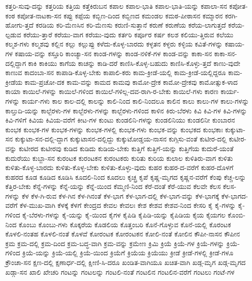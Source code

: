 {ಕತ್ತರಿ-ಸುವು-ದನ್ನು
ಕತ್ತರಿಯ
ಕತ್ತಿಯ
ಕತ್ತೆಕಿರುಬನ
ಕಪಾಲ
ಕಪಾಲ-ಭಾತಿ
ಕಪಾಲ-ಭಾತಿ-ಯನ್ನು
ಕಪಾಲಾ-ಸನ
ಕಪೋತ-ಕಂಠ
ಕಪೋತ-ನಾಟಕಾ-ಸನ
ಕಪ್ಪು
ಕಪ್ಪೆಯ
ಕಬ್ಬಿಣ-ದಿಂದ
ಕಬ್ಬಿಣದ
ಕಮಂಡಲ
ಕಮಠ-ಪೀಠಾಸನ
ಕಮ್ಮಾರನ
ಕರಗಿ-ಹೋಗು-ತ್ತದೆ
ಕರಡಿಯ
ಕರಿ-ಮೆಣಸಿನ
ಕರಿ-ಮೆಣಸು
ಕರುಣಿ-ಸುತ್ತಾನೆ
ಕರುಣೆ
ಕರುಣೆಯ
ಕರೆಯ-ಲಾಗುತ್ತದೆ
ಕರೆಯ-ಲ್ಪಡುವ
ಕರೆಯು-ತ್ತಾರೆ
ಕರೆಯು-ವಾಗ
ಕರೆಯು-ವುದು
ಕರ್ತರಿ
ಕರ್ಪೂರ
ಕರ್ಷ
ಕಲಶ
ಕಲಿಯು-ತ್ತಿರುವ
ಕಲೆಯು
ಕಲ್ಮಶ-ಗಳು
ಕಲ್ಮಶವು
ಕಲ್ಲಿನ
ಕಲ್ಲು
ಕಲ್ಲುಪ್ಪು
ಕಳೆದು-ಕೊಳ್ಳ-ಬಾರದು
ಕಳ್ಳತನ
ಕಳ್ಳರು
ಕಳ್ಳಿಯ
ಕವಿತೆ-ಗಳನ್ನು
ಕಷಾಯ-ಗಳ
ಕಷಾಯ-ವನ್ನು
ಕಸ್ತೂರಿ
ಕಾಂಚ್ಯಾ-ಸನ
ಕಾಂಡ-ಗಳನ್ನು
ಕಾಂಡ-ನಳಿಕೆ-ಗಳ
ಕಾಂಡ-ವನ್ನು
ಕಾಕಾ-ಸನ
ಕಾಕಾ-ಸನ-ದಲ್ಲಿದ್ದಾಗ
ಕಾಕಿ
ಕಾಕಿಯು
ಕಾಗೆಯ
ಕಾಚನ್ನು
ಕಾಡಿ-ದರೆ
ಕಾಣಿಸಿ-ಕೊಳ್ಳ-ಬಹುದು
ಕಾಣಿಸಿ-ಕೊಳ್ಳು-ತ್ತದೆ
ಕಾಣು-ವುದೇ
ಕಾಣುವ
ಕಾದಂಬಾ-ಸನ
ಕಾಪಾಡಿ-ಕೊಳ್ಳ-ಬೇಕು
ಕಾಪಾಲಿ-ಕರು
ಕಾಮ-ಕ್ರೀಡೆ-ಯಲ್ಲಿ
ಕಾಮ-ಕ್ರೀಡೆ-ಯಲ್ಲಿದ್ದರೂ
ಕಾಮ-ಕ್ರೀಡೆಯ
ಕಾಮ-ಪ್ರಚೋ-ದಕ
ಕಾಮ-ವನ್ನು
ಕಾಮದ
ಕಾಮವು
ಕಾಮೋ-ದ್ರೇಕ
ಕಾಮೋ-ದ್ರೇಕವು
ಕಾಮೋತ್ಸುಕ-ಳಾದ
ಕಾಯಾ
ಕಾಯಿಲೆ-ಗಳನ್ನು
ಕಾಯಿಲೆ-ಗಳಿಂದ
ಕಾಯಿಲೆ-ಗಳಿಲ್ಲ-ದವ-ರಾಗಿ-ರ-ಬೇಕು
ಕಾಯಿಲೆ-ಗಳು
ಕಾರಣ
ಕಾರ್ಯ-ಗಳನ್ನು
ಕಾರ್ಯ-ಗಳು
ಕಾಲ
ಕಾಲ-ದಲ್ಲಿ
ಕಾಲನ್ನು
ಕಾಲಿ-ನಿಂದ
ಕಾಲಿ-ನಿಂದಲೂ
ಕಾಲಿನ
ಕಾಲು
ಕಾಲು-ಗಳ
ಕಾಲು-ಗಳನ್ನು
ಕಾಲ್ತುದಿ-ಯನ್ನು
ಕಾಲ್ಬೆರಳು-ಗಳ
ಕಾಲ್ಬೆರಳು-ಗಳನ್ನು
ಕಾಲ್ಬೆರಳು-ಗಳಿಂದ
ಕಾಳಿನ
ಕಿರು-ಬೆರಳು
ಕಿವಿ
ಕಿವಿ-ಗಳ
ಕಿವಿ-ಗಳನ್ನು
ಕಿವಿ-ಗಳಿಗೆ
ಕಿವಿಯ
ಕಿವಿಯ-ವರೆಗೆ
ಕೀಟ-ಗಳ
ಕುಂಟು
ಕುಂಡಲಿನಿ-ಗಳನ್ನು
ಕುಂಡಲಿನಿಯು
ಕುಂಡಲಿನೀ
ಕುಂಬಾರನ
ಕುಂಭಕ
ಕುಂಭಕ-ಗಳ
ಕುಂಭಕ-ಗಳನ್ನು
ಕುಂಭಕ-ಗಳಲ್ಲಿ
ಕುಂಭಕ-ಗಳು
ಕುಂಭಕ-ವನ್ನು
ಕುಂಭಕದ
ಕುಂಭಕಾಃ
ಕುಕ್ಕುಟಾ-ಸನ
ಕುಕ್ಕುಟಾ-ಸನ-ದಲ್ಲಿ-ದ್ದಾಗ
ಕುಕ್ಕುಟಾಸನ-ದಲ್ಲಿದ್ದು
ಕುಕ್ಕುಟೋಡ್ಡಯ-ನಾಸನ
ಕುಗ್ಗಿಸು-ವಂತೆ
ಕುಟೀರ-ದಲ್ಲಿ
ಕುಟೀರ-ವನ್ನು
ಕುಟೀರದ
ಕುಟೀರವು
ಕುಡಿದ
ಕುಡಿದು
ಕುಡಿಯ-ಬೇಕು
ಕುತ್ತಿಗೆ
ಕುತ್ತಿಗೆ-ಯನ್ನು
ಕುತ್ತಿಗೆಯ
ಕುದುರೆ-ಯಂತೆ
ಕುದುರೆಯು
ಕುಬ್ಜಾ-ಸನ
ಕುರಂಟಕ
ಕುರಂಟಕನ
ಕುರಂಟಕರು
ಕುರಿತು
ಕುರಿಯ
ಕುಲಾಲ
ಕುಳಿತಿರು-ವಾಗ
ಕುಳಿತು
ಕುಳಿತು-ಕೊಳ್ಳ-ಬಾರದು
ಕುಳಿತು-ಕೊಳ್ಳ-ಬೇಕು
ಕುಳಿತು-ಕೊಳ್ಳು-ವುದು
ಕುಹರ
ಕುಹರ-ದ-ವರೆಗೆ
ಕುಹರ-ದೊಳಗೆ
ಕುಹರದ
ಕೂಡ
ಕೂಡಿದ
ಕೂಡಿಸಿ
ಕೂದಲಿ-ನಿಂದ
ಕೂದಲು
ಕೃಚ್ಛ್ರ
ಕೃಪೆ
ಕೃಷ್ಣ-ಮೃಗದ
ಕೃಷ್ಣನ-ವರೆಗೆ
ಕೆಂಪು
ಕೆಚ್ಚ-ಲನ್ನು
ಕೆತ್ತಿರ-ಬೇಕು
ಕೆನ್ನೆ-ಗಳನ್ನು
ಕೆನ್ನೆ-ಯನ್ನು
ಕೆನ್ನೆ-ಯಿಂದ
ಕೆಮ್ಮಣಿ-ನಿಂದ
ಕೆರೆ-ದಂತೆ
ಕೆರೆ-ಯುವ
ಕೆಲವೇ
ಕೆಲಸ
ಕೆಲಸ-ಗಳನ್ನು
ಕೆಳ
ಕೆಳ-ಗಿ-ರುವ
ಕೆಳ-ಗಿನ
ಕೆಳ-ಗಿನಂತೆ
ಕೆಳ-ಭಾಗ
ಕೆಳ-ಭಾಗ-ದಲ್ಲಿ
ಕೆಳ-ಭಾಗ-ವನ್ನು
ಕೆಳ-ಭಾಗಕ್ಕೆ
ಕೆಳ-ಭಾಗದ-ವರೆಗೆ
ಕೆಳ-ಮುಖ-ವಾಗಿ
ಕೆಳಕ್ಕೆ
ಕೆಳಗೆ
ಕೇಂದ್ರದ
ಕೇವಲ
ಕೇವಲಃ
ಕೇಶ
ಕೇಶವ
ಕೇಶವ-ನಿಂದ
ಕೇಸರಿ
ಕೈ
ಕೈ-ಗಳನ್ನು
ಕೈ-ಗಳಿಂದ
ಕೈ-ಬೆರಳು-ಗಳನ್ನು
ಕೈ-ಯನ್ನು
ಕೈ-ಯಿಂದ
ಕೈಗಳ
ಕೈಪಿಡಿ
ಕೈಪಿಡಿ-ಯನ್ನು
ಕೈಪಿಡಿಯ
ಕೈಯ
ಕೈಯಗಲ
ಕೊಂಬಿ-ನಿಂದ
ಕೊಂಬು
ಕೊಂಬು-ಗಳು
ಕೊಕ್ಕರೆಯ
ಕೊಡಲಿಯ
ಕೊತ್ತಂಬರಿ
ಕೊನೆ-ಗೊಳ್ಳುವ
ಕೊನೆ-ಯಲ್ಲಿ
ಕೊರಂಟಕ
ಕೊಳಲಿ-ನಂತಹ
ಕೊಳಲಿ-ನಂತೆ
ಕೊಳವೆ
ಕೋರಂಟಕ
ಕೋರಂಟಕನ
ಕೋಲಿ-ನಂತೆ
ಕೋಲಿನ
ಕೌಪೀ-ನಾಸನ
ಕೌಪೀನ
ಕ್ರಮ
ಕ್ರಮ-ದಲ್ಲಿ
ಕ್ರಮ-ದಿಂದ
ಕ್ರಮ-ಬದ್ಧ-ವಾಗಿ
ಕ್ರಮ-ವನ್ನು
ಕ್ರಮೇಣ
ಕ್ರಿಮಿ
ಕ್ರಿಯೆ
ಕ್ರಿಯೆ-ಗಳ
ಕ್ರಿಯೆ-ಗಳನ್ನು
ಕ್ರಿಯೆ-ಗಳಿಂದ
ಕ್ರಿಯೆ-ಯನ್ನು
ಕ್ರಿಯೆ-ಯಲ್ಲಿ
ಕ್ರಿಯೆ-ಯಿಂದ
ಕ್ರಿಯೆಗೆ
ಕ್ರಿಯೆಯ
ಕ್ರಿಯೆಯು
ಕ್ರೀಡೆ
ಕ್ರೀಡೆ-ಗಳಲ್ಲಿ
ಕ್ರೀಡೆ-ಗಳೂ
ಕ್ರೌಂಚಾ-ಸನ
ಕ್ಷಣ-ದಲ್ಲಿ
ಕ್ಷಣಾರ್ಧ-ದಲ್ಲಿ
ಕ್ಷೀಣಿ-ಸಿ-ದರೂ
ಖಂಡಿತ-ವಾಗಿಯೂ
ಖಚಿತ-ವಾಗಿ
ಖಡ್ಗ-ಮೃಗ
ಖಡ್ಗ-ಮೃಗದ
ಖಡ್ಗಾ-ಸನ
ಖಾಲಿ
ಖೇಚರಿ
ಗಂಟನ್ನು
ಗಂಟಲನ್ನು
ಗಂಟಲಿ-ನಂತೆ
ಗಂಟಲಿನ
ಗಂಟಲಿನ-ವರೆಗೆ
ಗಂಟಲು
ಗಂಟೆ-ಗಳ
}
